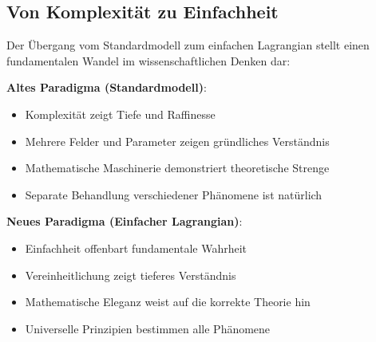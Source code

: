 	\subsection{Von Komplexität zu Einfachheit}
	
	Der Übergang vom Standardmodell zum einfachen Lagrangian stellt einen fundamentalen Wandel im wissenschaftlichen Denken dar:
	
	\textbf{Altes Paradigma (Standardmodell)}:
	\begin{itemize}
		\item Komplexität zeigt Tiefe und Raffinesse
		\item Mehrere Felder und Parameter zeigen gründliches Verständnis
		\item Mathematische Maschinerie demonstriert theoretische Strenge
		\item Separate Behandlung verschiedener Phänomene ist natürlich
	\end{itemize}
	
	\textbf{Neues Paradigma (Einfacher Lagrangian)}:
	\begin{itemize}
		\item Einfachheit offenbart fundamentale Wahrheit
		\item Vereinheitlichung zeigt tieferes Verständnis
		\item Mathematische Eleganz weist auf die korrekte Theorie hin
		\item Universelle Prinzipien bestimmen alle Phänomene
	\end{itemize}

